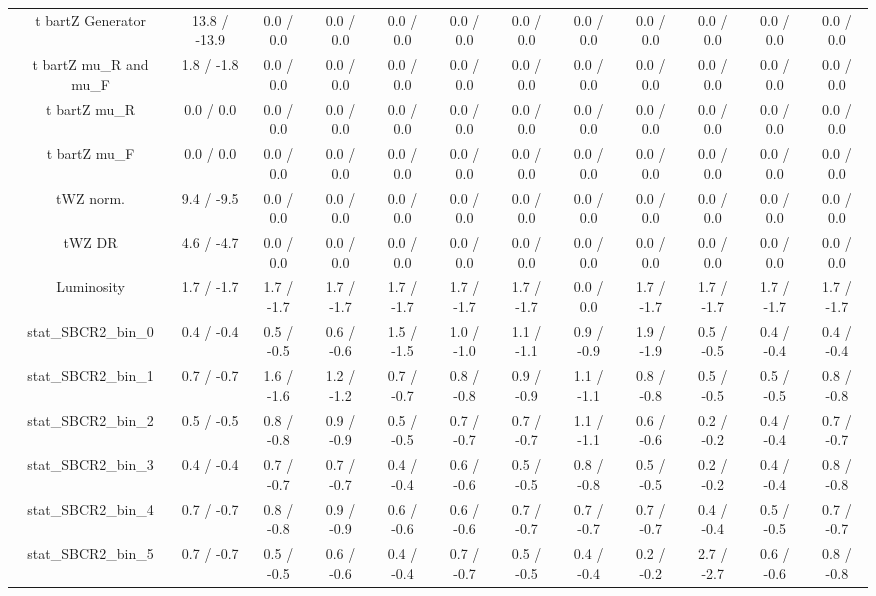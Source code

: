 \begin{table}[htbp]
\begin{center}
\begin{tabular}{|c|c|c|c|c|c|c|c|c|c|c|c|}
  t bar{t}Z Generator & 13.8 / -13.9 & 0.0 / 0.0 & 0.0 / 0.0 & 0.0 / 0.0 & 0.0 / 0.0 & 0.0 / 0.0 & 0.0 / 0.0 & 0.0 / 0.0 & 0.0 / 0.0 & 0.0 / 0.0 & 0.0 / 0.0 \\ 
  t bar{t}Z  mu_{R} and  mu_{F} & 1.8 / -1.8 & 0.0 / 0.0 & 0.0 / 0.0 & 0.0 / 0.0 & 0.0 / 0.0 & 0.0 / 0.0 & 0.0 / 0.0 & 0.0 / 0.0 & 0.0 / 0.0 & 0.0 / 0.0 & 0.0 / 0.0 \\ 
  t bar{t}Z  mu_{R} & 0.0 / 0.0 & 0.0 / 0.0 & 0.0 / 0.0 & 0.0 / 0.0 & 0.0 / 0.0 & 0.0 / 0.0 & 0.0 / 0.0 & 0.0 / 0.0 & 0.0 / 0.0 & 0.0 / 0.0 & 0.0 / 0.0 \\ 
  t bar{t}Z  mu_{F} & 0.0 / 0.0 & 0.0 / 0.0 & 0.0 / 0.0 & 0.0 / 0.0 & 0.0 / 0.0 & 0.0 / 0.0 & 0.0 / 0.0 & 0.0 / 0.0 & 0.0 / 0.0 & 0.0 / 0.0 & 0.0 / 0.0 \\ 
  tWZ norm. & 9.4 / -9.5 & 0.0 / 0.0 & 0.0 / 0.0 & 0.0 / 0.0 & 0.0 / 0.0 & 0.0 / 0.0 & 0.0 / 0.0 & 0.0 / 0.0 & 0.0 / 0.0 & 0.0 / 0.0 & 0.0 / 0.0 \\ 
  tWZ DR & 4.6 / -4.7 & 0.0 / 0.0 & 0.0 / 0.0 & 0.0 / 0.0 & 0.0 / 0.0 & 0.0 / 0.0 & 0.0 / 0.0 & 0.0 / 0.0 & 0.0 / 0.0 & 0.0 / 0.0 & 0.0 / 0.0 \\ 
  Luminosity & 1.7 / -1.7 & 1.7 / -1.7 & 1.7 / -1.7 & 1.7 / -1.7 & 1.7 / -1.7 & 1.7 / -1.7 & 0.0 / 0.0 & 1.7 / -1.7 & 1.7 / -1.7 & 1.7 / -1.7 & 1.7 / -1.7 \\ 
 stat_SBCR2_bin_0 & 0.4 / -0.4 & 0.5 / -0.5 & 0.6 / -0.6 & 1.5 / -1.5 & 1.0 / -1.0 & 1.1 / -1.1 & 0.9 / -0.9 & 1.9 / -1.9 & 0.5 / -0.5 & 0.4 / -0.4 & 0.4 / -0.4 \\ 
 stat_SBCR2_bin_1 & 0.7 / -0.7 & 1.6 / -1.6 & 1.2 / -1.2 & 0.7 / -0.7 & 0.8 / -0.8 & 0.9 / -0.9 & 1.1 / -1.1 & 0.8 / -0.8 & 0.5 / -0.5 & 0.5 / -0.5 & 0.8 / -0.8 \\ 
 stat_SBCR2_bin_2 & 0.5 / -0.5 & 0.8 / -0.8 & 0.9 / -0.9 & 0.5 / -0.5 & 0.7 / -0.7 & 0.7 / -0.7 & 1.1 / -1.1 & 0.6 / -0.6 & 0.2 / -0.2 & 0.4 / -0.4 & 0.7 / -0.7 \\ 
 stat_SBCR2_bin_3 & 0.4 / -0.4 & 0.7 / -0.7 & 0.7 / -0.7 & 0.4 / -0.4 & 0.6 / -0.6 & 0.5 / -0.5 & 0.8 / -0.8 & 0.5 / -0.5 & 0.2 / -0.2 & 0.4 / -0.4 & 0.8 / -0.8 \\ 
 stat_SBCR2_bin_4 & 0.7 / -0.7 & 0.8 / -0.8 & 0.9 / -0.9 & 0.6 / -0.6 & 0.6 / -0.6 & 0.7 / -0.7 & 0.7 / -0.7 & 0.7 / -0.7 & 0.4 / -0.4 & 0.5 / -0.5 & 0.7 / -0.7 \\ 
 stat_SBCR2_bin_5 & 0.7 / -0.7 & 0.5 / -0.5 & 0.6 / -0.6 & 0.4 / -0.4 & 0.7 / -0.7 & 0.5 / -0.5 & 0.4 / -0.4 & 0.2 / -0.2 & 2.7 / -2.7 & 0.6 / -0.6 & 0.8 / -0.8 \\ 

\end{tabular}
\end{center}
\end{table}
